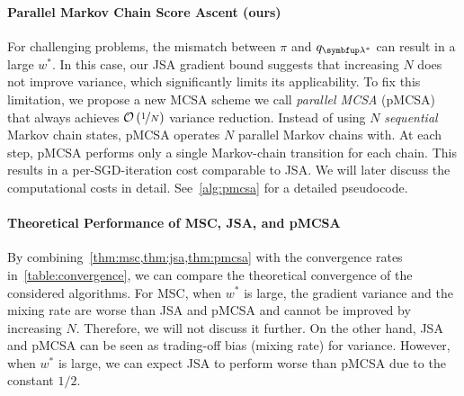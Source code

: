 \paragraph{Parallel Markov Chain Score Ascent (ours)}
For challenging problems, the mismatch between \(\pi\) and \(q_{\vlambda^*}\) can result in a large \(w^*\).
In this case, our JSA gradient bound suggests that increasing \(N\) does not improve variance, which significantly limits its applicability.
To fix this limitation, we propose a new MCSA scheme we call \textit{parallel MCSA} (pMCSA) that always achieves \(\mathcal{O}\left(\nicefrac{1}{N}\right)\) variance reduction.
Instead of using \(N\) \textit{sequential} Markov chain states, pMCSA operates \(N\) parallel Markov chains with.
At each step, pMCSA performs only a single Markov-chain transition for each chain.
This results in a per-SGD-iteration cost comparable to JSA.
We will later discuss the computational costs in detail.
See~\cref{alg:pmcsa} for a detailed pseudocode.




\vspace{-0.1in}
\paragraph{Theoretical Performance of MSC, JSA, and pMCSA}
By combining~\cref{thm:msc,thm:jsa,thm:pmcsa} with the convergence rates in~\cref{table:convergence}, we can compare the theoretical convergence of the considered algorithms.
For MSC, when \(w^*\) is large, the gradient variance and the mixing rate are worse than JSA and pMCSA and cannot be improved by increasing \(N\).
Therefore, we will not discuss it further.
On the other hand, JSA and pMCSA can be seen as trading-off bias (mixing rate) for variance.
However, when \(w^*\) is large, we can expect JSA to perform worse than pMCSA due to the constant \(1/2\).

\vspace{-0.1in}
